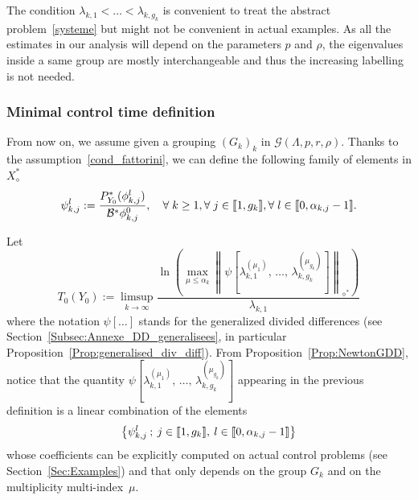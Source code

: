 \documentclass[AHL,Unicode,longabstracts]{cedram}
\newcommand{\llbracket}{\mathopen{[\mkern -2.7mu[}}
\newcommand{\rrbracket}{\mathclose{]\mkern -2.7mu]}}
\newcommand{\inter}[2]{\llbracket #1,#2 \rrbracket}
\newcommand\Bs{\mathcal{B}^*}
\newcommand{\Xalphas}{X_\diamond^*}
\newcommand{\Fzp}{Y_0}
\newcommand{\normeF}[1]{\left\| #1 \right\|_{\diamond^*}}
\newcommand{\PFa}{P_{\Fzp}^*}
\newcommand{\n}{g}
\let\oldforall\forall
\renewcommand*{\forall}{\mathrel{\oldforall}}
\begin{document}
\begin{rema}
The condition $\lambda_{k,1} < \dots < \lambda_{k,g_k}$ is convenient to treat the abstract problem~\eqref{systeme} but might not be convenient in actual examples. As all the estimates in our analysis will depend on the parameters $p$ and $\rho$, the eigenvalues inside a same group are mostly interchangeable and thus the increasing labelling is not needed.
\end{rema}


\subsubsection{Minimal control time definition}

From now on, we assume given a grouping $(G_k)_k$ in $\mathcal{G}(\Lambda,p,r,\rho)$. Thanks to the assumption~\eqref{cond_fattorini}, we can define the following family of elements in $\Xalphas$
\begin{equation}\label{Def_Psik}
\psi_{k,j}^l := \frac{\PFa(\phi_{k,j}^l)}{\Bs \phi_{k,j}^0}, \quad \forall k\geq 1, \forall j\in \inter{1}{\n_k}, \forall l \in \inter{0}{\alpha_{k,j}-1}.
\end{equation}



Let
\begin{equation}\label{Def:T0_DDgeneralisees}
T_0(\Fzp) := \limsup_{k\to \infty} \frac{\ln \left(\max \limits_{\mu\leq \alpha_k} \normeF{\psi\left[\lambda_{k,1}^{(\mu_1)},\,\dotsc,\,\lambda_{k,\n_k}^{(\mu_{\n_k})}\right] } \right)}{\lambda_{k,1}}
\end{equation}
where the notation $\psi[\dotsc]$ stands for the generalized divided differences (see Section~\ref{Subsec:Annexe_DD_generalisees}, in particular Proposition~\ref{Prop:generalised_div_diff}). From Proposition~\ref{Prop:NewtonGDD}, notice that the quantity $\psi[\lambda_{k,1}^{(\mu_1)},\,\dotsc,\,\lambda_{k,\n_k}^{(\mu_{\n_k})}]$ appearing in the previous definition is a linear combination of the elements
\[
\left\{ \psi_{k,j}^l \: ; \: j \in \inter{1}{\n_k}, \: l \in \inter{0}{\alpha_{k,j}-1} \right\}
\]
whose coefficients can be explicitly computed on actual control problems (see Section~\ref{Sec:Examples}) and that only depends on the group $G_k$ and on the multiplicity multi-index~$\mu$.
\end{document}
